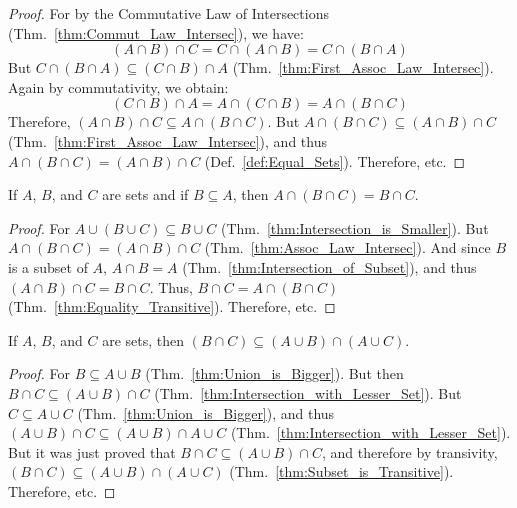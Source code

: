         \begin{proof}
            For by the Commutative Law of Intersections
            (Thm.~\ref{thm:Commut_Law_Intersec}),
            we have:
            \begin{equation}
                (A\cap{B})\cap{C}=C\cap(A\cap{B})
                                 =C\cap(B\cap{A})
            \end{equation}
            But $C\cap(B\cap{A})\subseteq(C\cap{B})\cap{A}$
            (Thm.~\ref{thm:First_Assoc_Law_Intersec}).
            Again by commutativity, we obtain:
            \begin{equation}
                (C\cap{B})\cap{A}=A\cap(C\cap{B})
                                 =A\cap(B\cap{C})
            \end{equation}
            Therefore,
            $(A\cap{B})\cap{C}\subseteq{A}\cap(B\cap{C})$.
            But $A\cap(B\cap{C})\subseteq(A\cap{B})\cap{C}$
            (Thm.~\ref{thm:First_Assoc_Law_Intersec}),
            and thus $A\cap(B\cap{C})=(A\cap{B})\cap{C}$
            (Def.~\ref{def:Equal_Sets}). Therefore, etc.
        \end{proof}
        \begin{theorem}
            \label{thm:Redundant_Intersection}%
            If $A$, $B$, and $C$ are sets and if
            $B\subseteq{A}$, then
            $A\cap(B\cap{C})=B\cap{C}$.
        \end{theorem}
        \begin{proof}
            For $A\cup(B\cup{C})\subseteq{B}\cup{C}$
            (Thm.~\ref{thm:Intersection_is_Smaller}). But
            $A\cap(B\cap{C})=(A\cap{B})\cap{C}$
            (Thm.~\ref{thm:Assoc_Law_Intersec}).
            And since $B$ is a subset of $A$,
            $A\cap{B}=A$
            (Thm.~\ref{thm:Intersection_of_Subset}),
            and thus $(A\cap{B})\cap{C}=B\cap{C}$. Thus,
            $B\cap{C}=A\cap(B\cap{C})$
            (Thm.~\ref{thm:Equality_Transitive}).
            Therefore, etc.
        \end{proof}
        \begin{theorem}
            \label{thm:First_Pseudo_Dist_Law_Union}%
            If $A$, $B$, and $C$ are sets, then
            $(B\cap{C})\subseteq(A\cup{B})\cap(A\cup{C})$.
        \end{theorem}
        \begin{proof}
            For $B\subseteq{A}\cup{B}$
            (Thm.~\ref{thm:Union_is_Bigger}). But then
            $B\cap{C}\subseteq(A\cup{B})\cap{C}$
            (Thm.~\ref{thm:Intersection_with_Lesser_Set}).
            But $C\subseteq{A}\cup{C}$
            (Thm.~\ref{thm:Union_is_Bigger}), and thus
            $(A\cup{B})\cap{C}%
             \subseteq(A\cup{B})\cap{A}\cup{C}$
            (Thm.~\ref{thm:Intersection_with_Lesser_Set}).
            But it was just proved that
            $B\cap{C}\subseteq(A\cup{B})\cap{C}$, and
            therefore by transivity,
            $(B\cap{C})\subseteq(A\cup{B})\cap(A\cup{C})$
            (Thm.~\ref{thm:Subset_is_Transitive}).
            Therefore, etc.
        \end{proof}
